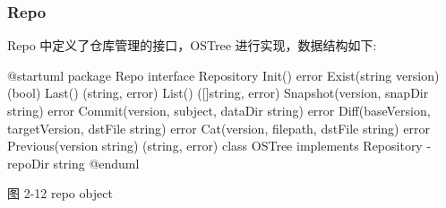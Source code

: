 \documentclass{utart}
\begin{document}
\subsubsection{Repo}
Repo 中定义了仓库管理的接口，OSTree 进行实现，数据结构如下: 
\begin{center}
  \begin{adjustbox}{scale=0.75}
    \begin{plantuml}
      @startuml
      package Repo {
        interface Repository {
          Init() error
          Exist(string version)(bool)
          Last() (string, error)
          List() ([]string, error)
          Snapshot(version, snapDir string) error
          Commit(version, subject, dataDir string) error
          Diff(baseVersion, targetVersion, dstFile string) error
          Cat(version, filepath, dstFile string) error
          Previous(version string) (string, error)
        }
        class OSTree implements Repository {
          - repoDir string
        }
      }
      @enduml
    \end{plantuml}
  \end{adjustbox}

  图 2-12 repo object
\end{center}
\end{document}
